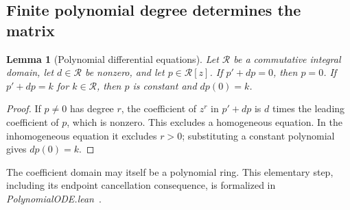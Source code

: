 \documentclass[11pt]{article}
\newtheorem{lemma}[theorem]{Lemma}
\theoremstyle{definition}
\theoremstyle{plain}
\numberwithin{equation}{section}
\begin{document}
\subsection{Finite polynomial degree determines the matrix}



\begin{lemma}[Polynomial differential equations]\label{lem:ode}
Let \(\mathcal R\) be a commutative integral domain, let \(d\in\mathcal R\) be nonzero,
and let \(p\in\mathcal R[z]\). If \(p'+dp=0\), then \(p=0\). If
\(p'+dp=k\) for \(k\in\mathcal R\), then \(p\) is constant and \(dp(0)=k\).
\end{lemma}

\begin{proof}
If \(p\ne0\) has degree \(r\), the coefficient of \(z^r\) in \(p'+dp\)
is \(d\) times the leading coefficient of \(p\), which is nonzero.
This excludes a homogeneous equation. In the inhomogeneous equation it
excludes \(r>0\); substituting a constant polynomial gives \(dp(0)=k\).
\end{proof}

The coefficient domain may itself be a polynomial ring. This elementary
step, including its endpoint cancellation consequence, is formalized in
\emph{PolynomialODE.lean}~\cite{lean}.
\end{document}
